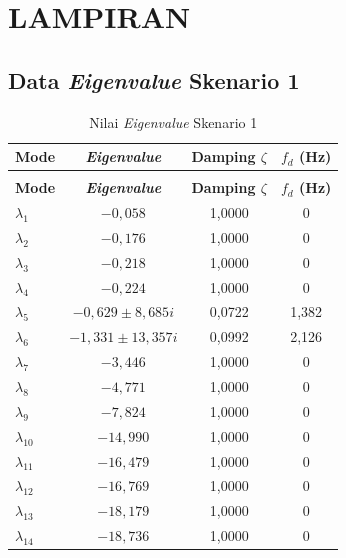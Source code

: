 ﻿\chapter*{LAMPIRAN}


\section{Data \textit{Eigenvalue} Skenario 1}

\begingroup
\fontsize{11}{13.2}\selectfont
\setlength{\tabcolsep}{7pt}
\begin{longtable}{>{\centering\arraybackslash}m{1.5cm} c c c} \caption[]{Nilai
	\textit{Eigenvalue} Skenario 1} \label{tab:eigenvalue_sk1_lampiran} \\
	\toprule
	\textbf{Mode} & \textbf{\textit{Eigenvalue}} & \textbf{Damping $\zeta$} &
	\textbf{$f_d$ (Hz)} \\
	\midrule
	\endfirsthead
	\multicolumn{4}{l}{\textit{(lanjutan)}} \\
	\toprule
	\textbf{Mode} & \textbf{\textit{Eigenvalue}} & \textbf{Damping $\zeta$} &
	\textbf{$f_d$ (Hz)} \\
	\midrule
	\endhead
	\bottomrule
	\endfoot
	$\lambda_1$  & $-0{,}058$                 & 1,0000 & 0 \\
	$\lambda_2$  & $-0{,}176$                 & 1,0000 & 0 \\
	$\lambda_3$  & $-0{,}218$                 & 1,0000 & 0 \\
	$\lambda_4$  & $-0{,}224$                 & 1,0000 & 0 \\
	$\lambda_5$  & $-0{,}629 \pm 8{,}685i$    & 0,0722 & 1,382 \\
	$\lambda_6$  & $-1{,}331 \pm 13{,}357i$   & 0,0992 & 2,126 \\
	$\lambda_7$  & $-3{,}446$                 & 1,0000 & 0 \\
	$\lambda_8$  & $-4{,}771$                 & 1,0000 & 0 \\
	$\lambda_9$  & $-7{,}824$                 & 1,0000 & 0 \\
	$\lambda_{10}$ & $-14{,}990$              & 1,0000 & 0 \\
	$\lambda_{11}$ & $-16{,}479$              & 1,0000 & 0 \\
	$\lambda_{12}$ & $-16{,}769$              & 1,0000 & 0 \\
	$\lambda_{13}$ & $-18{,}179$              & 1,0000 & 0 \\
	$\lambda_{14}$ & $-18{,}736$              & 1,0000 & 0 \\
\end{longtable}
\par
\endgroup

